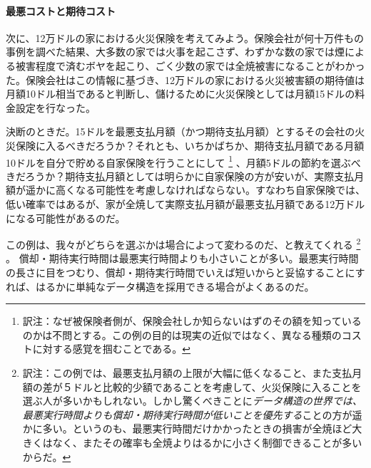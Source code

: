 \paragraph{最悪コストと期待コスト}
次に、12万ドルの家における火災保険を考えてみよう。保険会社が何十万件もの事例を調べた結果、大多数の家では火事を起こさず、わずかな数の家では煙による被害程度で済むボヤを起こり、ごく少数の家では全焼被害になることがわかった。保険会社はこの情報に基づき、12万ドルの家における火災被害額の期待値は月額10ドル相当であると判断し、儲けるために火災保険としては月額15ドルの料金設定を行なった。

決断のときだ。15ドルを最悪支払月額（かつ期待支払月額）とするその会社の火災保険に入るべきだろうか？それとも、いちかばちか、期待支払月額である月額10ドルを自分で貯める自家保険を行うことにして
\footnote{訳注：なぜ被保険者側が、保険会社しか知らないはずのその額を知っているのかは不問とする。この例の目的は現実の近似ではなく、異なる種類のコストに対する感覚を掴むことである。}
、月額5ドルの節約を選ぶべきだろうか？期待支払月額としては明らかに自家保険の方が安いが、実際支払月額が遥かに高くなる可能性を考慮しなければならない。すなわち自家保険では、低い確率ではあるが、家が全焼して実際支払月額が最悪支払月額である12万ドルになる可能性があるのだ。

この例は、我々がどちらを選ぶかは場合によって変わるのだ、と教えてくれる
\footnote{訳注：この例では、最悪支払月額の上限が大幅に低くなること、また支払月額の差が５ドルと比較的少額であることを考慮して、火災保険に入ることを選ぶ人が多いかもしれない。しかし驚くべきことに\emph{データ構造の世界では、最悪実行時間よりも償却・期待実行時間が低いことを優先する}ことの方が遥かに多い。というのも、最悪実行時間だけかかったときの損害が全焼ほど大きくはなく、またその確率も全焼よりはるかに小さく制御できることが多いからだ。}
。
償却・期待実行時間は最悪実行時間よりも小さいことが多い。最悪実行時間の長さに目をつむり、償却・期待実行時間でいえば短いからと妥協することにすれば、はるかに単純なデータ構造を採用できる場合がよくあるのだ。

